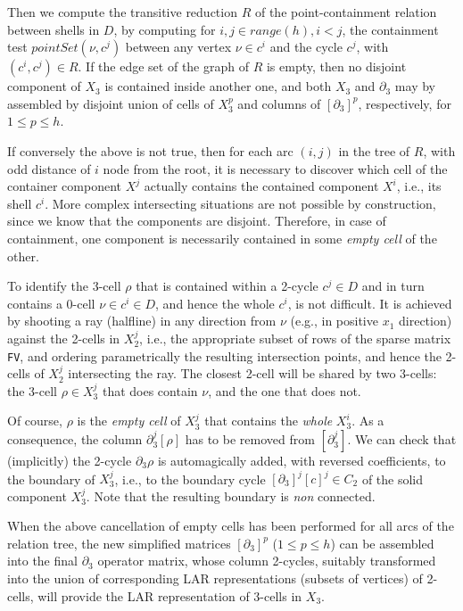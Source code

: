 {Then we compute} the transitive reduction $R$ of the point-containment relation between shells in $D$, by computing for $i,j\in \mathit{range}(h), i<j$, the containment test $\mathit{pointSet}(\nu,c^j)$ between any vertex $\nu \in c^i$ and the cycle $c^j$, with $(c^i,c^j)\in R$.
If the edge set of the graph of $R$ is empty, then no disjoint component of $X_3$ is contained inside another one, and both $X_3$ and $\partial_3$ may by assembled by disjoint union of cells of $X_3^p$ and columns of $[\partial_3]^p$, respectively, for $1\leq p\leq h$.

If conversely the above is not true, then for each arc $(i,j)$ in the tree of $R$, with odd distance of $i$ node from the root, it is necessary to discover which cell of the container component $X^j$ actually contains the contained component $X^i$, i.e., its shell $c^i$. More complex intersecting situations are not possible {by construction}, since we know that the components are disjoint. Therefore, in case of containment, one component is necessarily contained in some \emph{empty cell} of the other.

To identify the 3-cell $\rho$ that is contained within a 2-cycle $c^j\in D$ and in turn contains a 0-cell $\nu\in c^i\in D$, and hence the whole $c^i$, is not difficult.
{It is achieved by shooting a ray} (halfline) in any direction from $\nu$ (e.g., in positive $x_1$ direction) against the 2-cells in $X_2^j$, i.e., the appropriate subset of rows of the sparse matrix \texttt{FV}, {and ordering parametrically} the resulting intersection points, and hence the 2-cells of $X_2^j$ intersecting the ray. The closest 2-cell will be shared by two 3-cells: the 3-cell $\rho\in X_3^j$ that does contain $\nu$, and the one that does not. 

Of course, $\rho$ is the \emph{empty cell} of $X_3^j$ that contains the \emph{whole} $X_3^i$. 
As a consequence, the column $\partial_3^j[\rho]$ has to be {removed} from $[\partial_3^j]$. We can check that (implicitly) the 2-cycle $\partial_3\rho$ is {automagically} added, with reversed coefficients, to the boundary of $X_3^j$, i.e., to the boundary cycle $[\partial_3]^j[c]^j \in C_2$ of the solid component $X_3^j$. Note that the resulting  boundary is {\emph{non} connected}.

When the above cancellation of empty cells has been performed for all  arcs of the relation tree, the new simplified matrices $[\partial_3]^p$ ($1\leq p\leq h$) can be assembled into the final $\partial_3$ operator matrix, whose column 2-cycles, suitably transformed into the union of corresponding LAR representations (subsets of vertices) of  2-cells, will provide the LAR representation of 3-cells in $X_3$.



